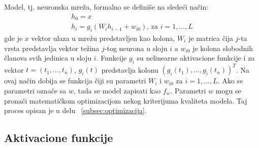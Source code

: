 Model, tj. neuronska mreža, formalno se definiše na sledeći način:
\begin{equation}
	\label{eq:nn}
	\begin{gathered}
		h_0 = x  \\
	 	h_i = g_i(W_ih_{i-1} + w_{i0}) \text{,~za~} i=1, ..., L
	\end{gathered}
\end{equation}
gde je $x$ vektor ulaza u mrežu predstavljen kao kolona, $W_i$ je matrica čija $j$-ta vrsta predstavlja vektor težina $j$-tog neurona u sloju $i$ a $w_{i0}$ je kolona slobodnih članova svih jedinica u sloju $i$. Funkcije $g_i$ su nelinearne aktivacione funkcije i za vektor $t=(t_1, ..., t_n)$, $g_i(t)$ predstavlja kolonu $(g_i(t_1), ..., g_i(t_n))^T$. Na ovaj način dobija se funkcija čiji su parametri $W_i$ i $w_{i0}$ za $i=1,...,L$. Ako se parametri označe sa $w$, tada se model zapisati kao $f_w$. Parametri $w$ mogu se pronaći matematičkom optimizacijom nekog kriterijuma kvaliteta modela. Taj proces opisan je u delu ~\ref{subsec:optimizacija}.

\subsection{Aktivacione funkcije}

